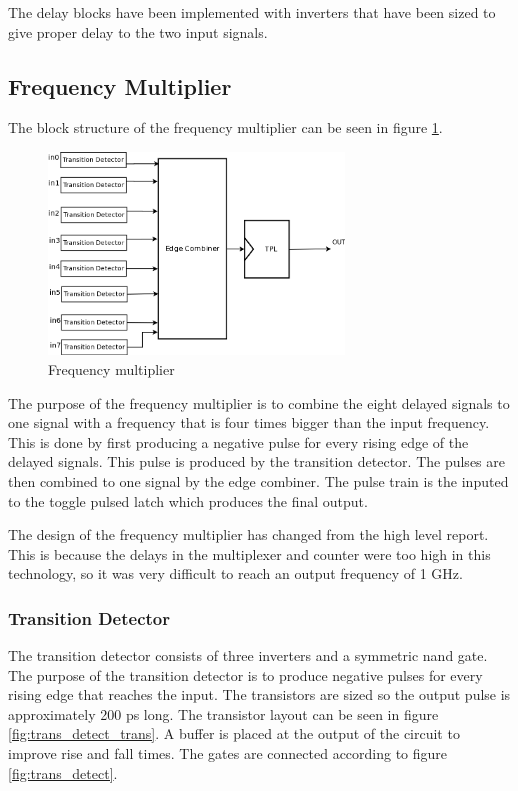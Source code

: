 \documentclass[a4paper,12pt]{article} \usepackage{graphicx}
\begin{document}
The delay blocks have been implemented with inverters that have been
sized to give proper delay to the two input signals.

\subsection{Frequency Multiplier}
The block structure of the frequency multiplier can be seen in figure 
\ref{fig:freq_mult}.
\begin{figure}[p]
        \centering
        \includegraphics[width=0.7\textwidth]{../Bilder/freq_mult_trans.png}
        \caption{Frequency multiplier}
        \label{fig:freq_mult}
\end{figure}

The purpose of the frequency multiplier is to combine the eight delayed signals
to one signal with a frequency that is four times bigger than the input
frequency. This is done by first producing a negative pulse for every rising
edge of the delayed signals. This pulse is produced by the transition detector.
The pulses are then combined to one signal by the edge combiner. The pulse
train is the inputed to the toggle pulsed latch which produces the final output.

The design of the frequency multiplier has changed from the high level report.
This is because the delays in the multiplexer and counter were too high in this
technology, so it was very difficult to reach an output frequency of 1 GHz.

\subsubsection{Transition Detector}
\label{sec:trans_detect}
The transition detector consists of three inverters and a symmetric nand gate.
The purpose of the transition detector is to produce negative pulses for every
rising edge that reaches the input. The transistors are sized so the output
pulse is approximately 200 ps long. The transistor layout can be seen
in figure \ref{fig:trans_detect_trans}.
A buffer is placed at the output of the circuit to improve rise and fall times.
The gates are connected according to figure \ref{fig:trans_detect}.
\end{document}
